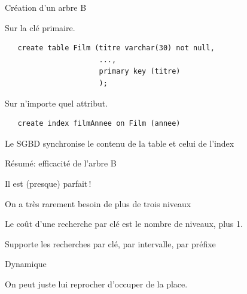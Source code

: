 \begin{frame}[fragile]{Création d'un arbre B}

Sur la clé primaire.

\begin{verbatim}
   create table Film (titre varchar(30) not null,
                      ...,
                      primary key (titre)
                      );
\end{verbatim}
\vfill

Sur n'importe quel attribut.

\begin{verbatim}
   create index filmAnnee on Film (annee)
\end{verbatim}

\vfill

Le SGBD synchronise le contenu de la table et celui de l'index
\end{frame}
\begin{frame}{Résumé: efficacité de l'arbre B}


Il est (presque) parfait\,!

\begin{redbullet}
  \item On a très rarement besoin de plus de trois niveaux
  \item Le coût d'une recherche par clé est le nombre de niveaux, plus 1.

  \item Supporte les recherches par clé, par intervalle,
             par préfixe
  \item Dynamique
\end{redbullet}
On peut juste lui reprocher d'occuper de la place.

\end{frame}